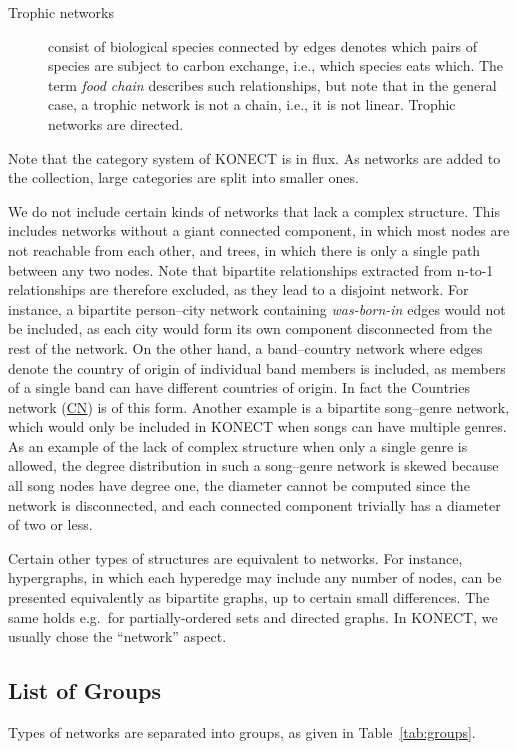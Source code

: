 \documentclass{article}
\begin{document}
\begin{description}
\item[Trophic networks] consist of biological 
   species connected by edges denotes which
  pairs of species are subject to carbon exchange, i.e., which species
  eats which.  The term \emph{food chain} describes such relationships,
  but note that in the general case, a trophic network is not a chain,
  i.e., it is not linear.  Trophic networks are directed.

\end{description}

Note that the category system of KONECT is in flux.  As networks are
added to the collection, large categories are split into smaller ones. 

We do not include certain kinds of networks that lack a complex
structure. This includes networks without a giant connected component,
in which most nodes are not reachable from each other, and trees, in
which there is only a single path between any two nodes.  Note that
bipartite relationships extracted from n-to-1 relationships are
therefore excluded, as they lead to a disjoint network. For instance, a
bipartite person--city network containing \emph{was-born-in} edges would
not be included, as each city would form its own component disconnected
from the rest of the network.  On the other hand, a band--country
network where edges denote the country of origin of individual band
members is included, as members of a single band can have different
countries of origin. In fact the Countries network
(\href{http://konect.cc/networks/dbpedia-country/}{\textsf{CN}})
is of this form.  Another example is a bipartite song--genre network,
which would only be included in KONECT when songs can have multiple
genres.  As an example of the lack of complex structure when only a
single genre is allowed, the degree distribution in such a song--genre
network is skewed because all song nodes have degree one, the diameter
cannot be computed since the network is disconnected, and each connected
component trivially has a diameter of two or less.

Certain other types of structures are equivalent to networks.  For
instance, hypergraphs, in which each hyperedge may include any number of
nodes, can be presented equivalently as bipartite graphs, up to certain
small differences.  The same holds e.g.\ for partially-ordered sets and
directed graphs.  In KONECT, we usually chose the ``network'' aspect. 

\subsection{List of Groups}
\label{sec:groups}
Types of networks are separated into groups, as given in
Table~\ref{tab:groups}. 
\end{document}
